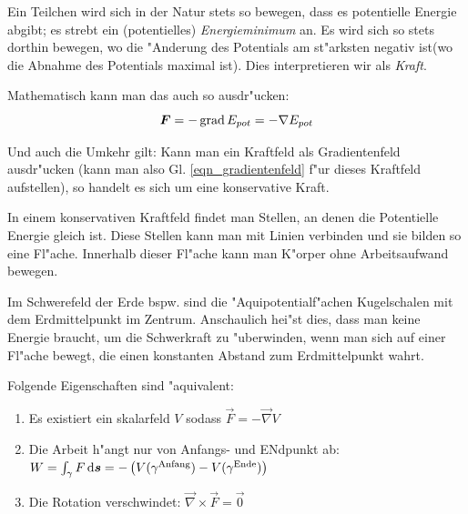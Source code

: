 Ein Teilchen wird sich in der Natur stets so bewegen, dass es
potentielle Energie abgibt; es strebt ein (potentielles)
\emph{Energieminimum} an. Es wird sich so stets
dorthin bewegen, wo die "Anderung des Potentials am st"arksten negativ
ist(wo die Abnahme des Potentials maximal ist).
Dies interpretieren wir als \emph{Kraft}.

Mathematisch kann man das auch so ausdr"ucken:
\begin{equation}
   \label{eqn_gradientenfeld}
   \Vec F = - \Grad E_{pot} = - \nabla E_{pot}
\end{equation}

Und auch die Umkehr gilt: Kann man ein Kraftfeld als Gradientenfeld
ausdr"ucken (kann man also Gl. \eqref{eqn_gradientenfeld} f"ur dieses
Kraftfeld aufstellen), so handelt es sich um eine konservative Kraft.



\begin{Wichtig}
\label{def_aequipotentialflaechen}
In einem konservativen Kraftfeld findet man Stellen, an denen die
Potentielle Energie gleich ist. Diese Stellen kann man mit Linien verbinden und sie
bilden so eine Fl"ache. Innerhalb dieser Fl"ache kann man K"orper ohne
Arbeitsaufwand bewegen.   
\end{Wichtig}

Im Schwerefeld der Erde bspw. sind die "Aquipotentialf"achen
Kugelschalen mit dem Erdmittelpunkt im Zentrum. Anschaulich hei"st
dies, dass man keine Energie braucht, um die Schwerkraft zu
"uberwinden, wenn man sich auf einer Fl"ache bewegt, die einen
konstanten Abstand zum Erdmittelpunkt wahrt.



\begin{Wichtig}
    Folgende
   Eigenschaften sind "aquivalent:
   \begin{enumerate}
   \item Es existiert ein skalarfeld $V$ sodass $\vec F = -\vec\nabla V$
   \item Die Arbeit h"angt nur von Anfangs- und ENdpunkt ab: $W =
      \int_\gamma F\, \mathrm{d}\boldsymbol{s} = -\left(V(\gamma^\text{Anfang}) -
         V(\gamma^\text{Ende})\right)$
   \item Die Rotation verschwindet: $\vec\nabla\times \vec F = \vec 0$
   \end{enumerate}
\end{Wichtig}












